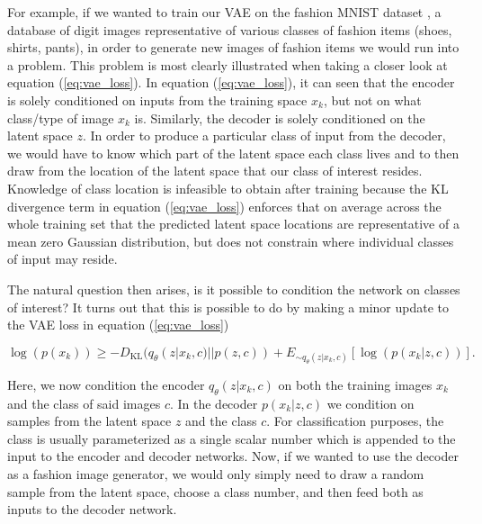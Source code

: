 For example, if we wanted to train our \ac{VAE} on 
the fashion MNIST dataset \cite{DBLP:journals/corr/abs-1708-07747}, 
a database of digit images representative of various classes 
of fashion items (shoes, shirts, pants), in order to 
generate new images of fashion items we would run into 
a problem. This problem is most clearly illustrated when 
taking a closer look at equation (\ref{eq:vae_loss}). In 
equation (\ref{eq:vae_loss}), it can seen that the encoder 
is solely conditioned on inputs from the training space 
$x_k$, but not on what class/type of image $x_k$ is. Similarly, 
the decoder is solely conditioned on the latent space $z$. In order 
to produce a particular class of input from the decoder, we would have 
to know which part of the latent space each class lives and to then 
draw from the location of the latent space that our class of 
interest resides. Knowledge of class location is infeasible to obtain 
after training because the KL 
divergence term in equation (\ref{eq:vae_loss}) enforces that 
on average across the whole training set that the predicted 
latent space locations are representative 
of a mean zero Gaussian distribution, but does not constrain where 
individual classes of input may reside.

The natural question then arises, is it possible to condition 
the network on classes of interest? It turns out that this is 
possible to do by making a minor update to the 
\ac{VAE} loss in equation (\ref{eq:vae_loss})

\begin{equation}
    \log(p(x_k)) \geq - D_{\textrm{KL}}(q_{\theta}(z|x_k,c) || p(z,c)) + 
    E_{\sim q_{\theta}(z|x_k,c)}[ \log({p(x_k|z,c)})].
\end{equation}

Here, we now condition the encoder $q_{\theta}(z|x_k,c)$ on both 
the training images $x_k$ and the class of said images $c$. In the decoder 
$p(x_k|z,c)$ we condition on samples from the latent space $z$ and the 
class $c$. For classification purposes, the class is usually 
parameterized as a single scalar number which is appended to the input to 
the encoder and decoder networks. Now, if we wanted to use the decoder 
as a fashion image generator, we would only simply need to draw a 
random sample from the latent space, choose a class number, and then 
feed both as inputs to the decoder network. 